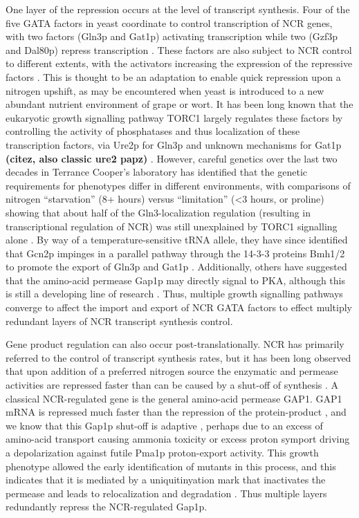 One layer of
the repression occurs at the level of transcript synthesis. Four of
the five GATA factors in yeast coordinate to control transcription of
NCR genes, with two factors (Gln3p and Gat1p) activating transcription
while two (Gzf3p and Dal80p) repress transcription 
\parencite{hahn2011transcriptional,stanbrough1995transcriptional}. 
These factors are also subject to NCR
control to different extents, with the activators increasing the
expression of the repressive factors 
\parencite{cunningham2000nitrogen}. 
This is thought to be an
adaptation to enable quick repression upon a nitrogen upshift, as may
be encountered when yeast is introduced to a new abundant nutrient
environment of grape or wort. It has been long known that the
eukaryotic growth signalling pathway TORC1 largely regulates these
factors by controlling the activity of phosphatases and thus
localization of these transcription factors, via Ure2p for Gln3p 
\parencite{beck1999tor} 
and unknown mechanisms for Gat1p
\textbf{(citez, also classic ure2 papz)}
. However, careful genetics over the last two decades in
Terrance Cooper's laboratory has identified that the genetic
requirements for phenotypes differ in different environments, with
comparisons of nitrogen “starvation” (8+ hours) versus “limitation”
(<3 hours, or proline) showing that about half of the
Gln3-localization regulation (resulting in transcriptional regulation
of NCR) was still unexplained by TORC1 signalling alone
\parencite{tate2013five}. By way
of a temperature-sensitive tRNA allele, they have since identified
that Gcn2p impinges in a parallel pathway through the 14-3-3 proteins
Bmh1/2 to promote the export of Gln3p and Gat1p 
\parencite{tate2015gata,tate2017general}. 
Additionally, others have suggested that the
amino-acid permease Gap1p may directly signal to PKA, although this is
still a developing line of research
\parencite{donaton2003gap1,van2009transport}.
Thus, multiple growth signalling pathways converge to
affect the import and export of NCR GATA factors to effect multiply
redundant layers of NCR transcript synthesis control.  

Gene product
regulation can also occur post-translationally. NCR has primarily
referred to the control of transcript synthesis rates, but it has been
long observed that upon addition of a preferred nitrogen source the
enzymatic and permease activities are repressed faster than can be
caused by a shut-off of synthesis 
\parencite{cooper1983function}. A
classical NCR-regulated gene is the general amino-acid permease GAP1.
GAP1 mRNA is repressed much faster than the repression of the
protein-product 
\parencite{stanbrough1995transcriptional}, and we know that this
Gap1p shut-off is adaptive \parencite{risinger2006activity}, 
perhaps due to an
excess of amino-acid transport causing ammonia toxicity 
\parencite{hess2006ammonium}
or excess proton symport driving a depolarization against futile
Pma1p proton-export activity. This growth phenotype allowed the early
identification of mutants in this process, and this indicates that it
is mediated by a uniquitinyation mark that inactivates the permease
and leads to relocalization and degradation 
\parencite{grenson1983inactivation,risinger2008different,merhi2012internal}. 
Thus multiple layers redundantly repress the NCR-regulated Gap1p.  

